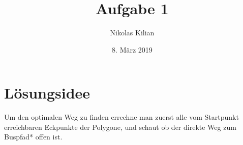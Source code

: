 \documentclass[12pt]{article}
\title{\vspace{-2.0cm}Aufgabe 1}
\author{Nikolas Kilian}
\date{8. März 2019}
\begin{document}
\maketitle

\section{Lösungsidee}
Um den optimalen Weg zu finden errechne man zuerst alle vom Startpunkt erreichbaren Eckpunkte der Polygone, und schaut ob der direkte Weg zum Buspfad* offen ist. 
\end{document}
